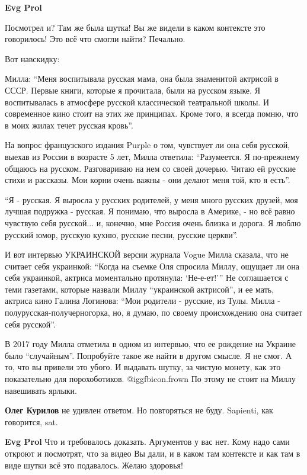 \begin{itemize}
\begin{itemize}
\begin{itemize}
\textbf{Evg Prol} 

Посмотрел и? Там же была шутка! Вы же видели в каком контексте это говорилось!
Это всё что смогли найти? Печально. 

Вот навскидку: 

Милла: \enquote{Меня воспитывала
русская мама, она была знаменитой актрисой в СССР. Первые книги, которые я
прочитала, были на русском языке. Я воспитывалась в атмосфере русской
классической театральной школы. И современное кино стоит на этих же принципах.
Кроме того, я всегда помню, что в моих жилах течет русская кровь}. 

На вопрос французского издания Purple о том, чувствует ли она себя русской,
выехав из России в возрасте 5 лет, Милла ответила: \enquote{Разумеется. Я по-прежнему
общаюсь на русском. Разговариваю на нем со своей дочерью. Читаю ей русские
стихи и рассказы. Мои корни очень важны - они делают меня той, кто я есть}. 

\enquote{Я - русская. Я выросла у русских родителей, у меня много русских друзей, моя лучшая
подружка - русская. Я понимаю, что выросла в Америке, - но всё равно чувствую
себя русской... и, конечно, мне Россия очень близка и дорога. Я люблю русский
юмор, русскую кухню, русские песни, русские церкви}. 

И вот интервью УКРАИНСКОЙ версии журнала Vogue Милла сказала, что не считает
себя украинкой: \enquote{Когда на съемке Оля спросила Миллу, ощущает ли она
себя украинкой, актриса моментально протянула: \enquote{Не-е-ет!}} Не
соглашается с теми газетами, которые назвали Миллу \enquote{украинской
актрисой}, и ее мать, актриса кино Галина Логинова: \enquote{Мои родители -
русские, из Тулы. Милла - полурусская-получерногорка, но, я думаю, по своему
происхождению она считает себя русской}. 

В 2017 году Милла отметила в одном из интервью, что ее рождение на Украине было
\enquote{случайным}. Попробуйте такое же найти в другом смысле. Я не смог. А то, что вы
привели это убого. И выдавать шутку, за чистую монету, как это показательно для
порохоботиков.  @igg{fbicon.frown}  По этому не стоит на Миллу навешивать ярлыки.


\textbf{Олег Курилов} не удивлен ответом. Но повторяться не буду. Sapienti, как говорится, sat.

\textbf{Evg Prol} Что и требовалось доказать. Аргументов у вас нет. Кому надо сами откроют и посмотрят, что за видео Вы дали, и в каком там контексте и как там в виде шутки всё это подавалось. Желаю здоровья!
\end{itemize} %


\end{itemize}
\end{itemize}
